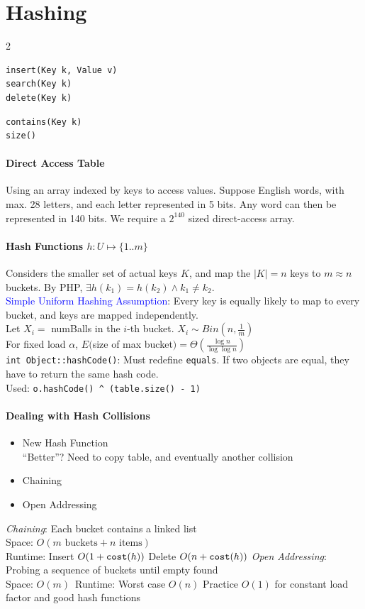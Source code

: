 \section{Hashing}
\begin{multicols*}{2}
\begin{verbatim}
insert(Key k, Value v)
search(Key k)
delete(Key k)
\end{verbatim}
\begin{verbatim}
contains(Key k)
size()
\end{verbatim}
\end{multicols*}
\paragraph{Direct Access Table}
Using an array indexed by keys to access values. Suppose English words, with
max. 28 letters, and each letter represented in 5 bits. Any word can then be
represented in 140 bits. We require a $2^{140}$ sized direct-access array.
\paragraph{Hash Functions $h:U\mapsto\{1..m\}$}
Considers the smaller set of actual keys $K$, and map the
$|K|=n$ keys to $m\approx n$ buckets. By PHP, $\exists h(k_{1})=h(k_{2}) \wedge k_{1}\neq k_{2}$.\\
\textcolor{Blue}{Simple Uniform Hashing Assumption}: Every key is equally
likely to map to every bucket, and keys are mapped independently.\\
Let $X_i=$ numBalls in the $i$-th bucket. $X_{i}\sim Bin(n, \frac{1}{m})$\\
For fixed load $\alpha$, $E($size of max bucket$)=\Theta(\frac{\log n}{\log \log n})$\\
\verb|int Object::hashCode()|: Must redefine \verb|equals|. If two objects are
equal, they have to return the same hash code.\\
Used: \verb|o.hashCode() ^ (table.size() - 1)|
\paragraph{Dealing with Hash Collisions}
\begin{itemize}
  \item New Hash Function\\
    ``Better''? Need to copy table, and eventually another collision
  \item Chaining
  \item Open Addressing
\end{itemize}
\emph{Chaining}: Each bucket contains a linked list\\
\textcolor{Bittersweet}{Space}: $O(m\text{ buckets} + n\text{ items})$\\
\textcolor{Bittersweet}{Runtime}: Insert $O(1 + \verb|cost|(h))$ Delete $O(n + \verb|cost|(h))$
\emph{Open Addressing}: Probing a sequence of buckets until empty found\\
\textcolor{Bittersweet}{Space}: $O(m)$\ \textcolor{Bittersweet}{Runtime}: Worst case $O(n)$ Practice $O(1)$ for
constant load factor and good hash functions
